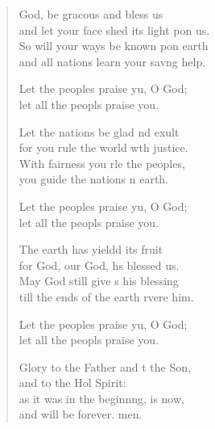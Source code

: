 \settowidth{\versewidth}{and let your face shed its light upon us.}
\begin{verse}%
  \begin{patverse}
 God, be grac\pointup{\i}ous and bless us\Med\\
and let your face shed its light pon us.\\
So will your ways be known pon earth\Med\\
and all nations learn your sav\pointup{\i}ng help.

Let the peoples praise yu, O God;\Med\\
let all the peopls praise you.

Let the nations be glad nd exult\Med\\
for you rule the world w\pointup{\i}th justice.\\
With fairness you rle the peoples,\Med\\
you guide the nations n earth.

Let the peoples praise yu, O God;\Med\\
let all the peopls praise you.

The earth has yieldd its fruit\Med\\
for God, our God, hs blessed us.\\
May God still give s his blessing\Med\\
till the ends of the earth rvere him.

Let the peoples praise yu, O God;\Med\\
let all the peopls praise you.

Glory to the Father and t the Son,\Med\\
and to the Hol Spirit:\\
as it was in the beginn\pointup{\i}ng, is now,\Med\\
and will be forever. men.
  \end{patverse}
\end{verse}
